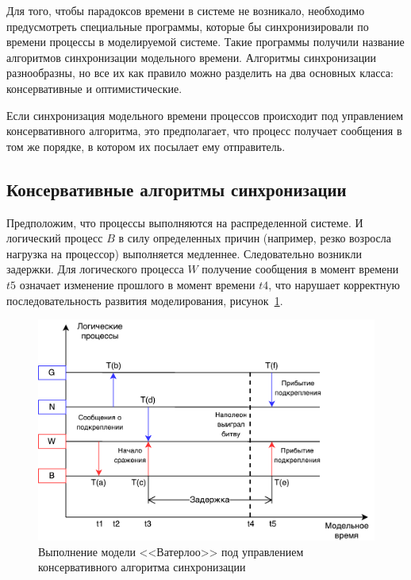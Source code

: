 Для того, чтобы парадоксов времени в системе не возникало, необходимо предусмотреть специальные программы, которые бы синхронизировали по времени процессы в моделируемой системе. Такие программы получили название алгоритмов синхронизации модельного времени. Алгоритмы синхронизации разнообразны, но все их как правило можно разделить на два основных класса: консервативные и оптимистические.

Если синхронизация модельного времени процессов происходит под управлением консервативного алгоритма, это предполагает, что процесс получает сообщения в том же порядке, в котором их посылает ему отправитель.

\subsection{Консервативные алгоритмы синхронизации} \label{subsect1}

Предположим, что процессы выполняются на распределенной системе. И логический процесс $B$ в силу определенных причин (например, резко возросла нагрузка на процессор) выполняется медленнее. Следовательно возникли задержки. Для логического процесса $W$ получение сообщения в момент времени $t5$ означает изменение прошлого в момент времени $t4$, что нарушает корректную последовательность развития моделирования, рисунок~\ref{fig:Выполнение модели <<Ватерлоо>> под управлением консервативного алгоритма синхронизации}.

\begin{figure}[!ht]
\centering
\includegraphics[scale=1]{images/waterloo-kas.pdf}
\caption{Выполнение модели <<Ватерлоо>> под управлением консервативного алгоритма синхронизации}
\label{fig:Выполнение модели <<Ватерлоо>> под управлением консервативного алгоритма синхронизации}
\end{figure}

